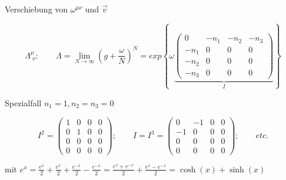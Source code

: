 Verschiebung von \(\omega^{\mu\nu}\) und \(\vec v\)


\[\Lambda^\mu_{\,\,\nu}: \qquad \Lambda = \lim_{N \to \infty} (g+\frac{\omega}{N})^N = exp\left\{\omega\underbrace{ \begin{pmatrix} 0&-n_1&-n_2&-n_3\\  -n_1&0&0&0\\   -n_2&0&0&0\\  -n_3&0&0&0 \end{pmatrix}}_{I}  \right\}\]

Spezialfall \(n_1 = 1, n_2=n_3 = 0\)

\[I^2 = \begin{pmatrix} 1&0&0&0\\ 0&1&0&0 \\ 0&0&0&0\\ 0&0&0&0 \end{pmatrix};\qquad I=I^3=\begin{pmatrix} 0&-1&0&0\\ -1&0&0&0 \\ 0&0&0&0\\ 0&0&0&0 \end{pmatrix};\qquad etc. \]

mit \( e^x = \frac{e^x}{2}+ \frac{e^x}{2} + \frac{e^{-x}}{2} - \frac{e^{-x}}{2} = \frac{e^x+e^{-x}}{2} + \frac{e^x-e^{-x}}{2} = \cosh(x)+\sinh(x)\)

